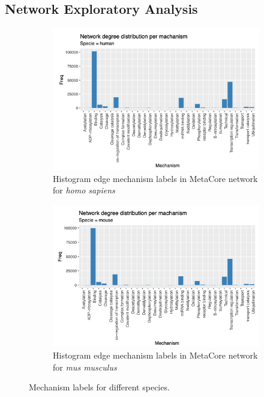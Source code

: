 \subsection{Network Exploratory Analysis}
\label{section:suppl:eda}

\begin{figure}[!htbp]
    \begin{subfigure}{0.5\linewidth}
        \includegraphics[width=\textwidth, height=\textheight, keepaspectratio]{Major Thesis/figures/eda/Degree_human.png}
            \caption{Histogram edge mechanism labels in MetaCore network for \textit{homo sapiens}}
    \end{subfigure}
    \hfill
    \begin{subfigure}{0.5\linewidth}
        \includegraphics[width=\textwidth, height=\textheight, keepaspectratio]{Major Thesis/figures/eda/Degree_mice.png}
            \caption{Histogram edge mechanism labels in MetaCore network for \textit{mus musculus}}
    \end{subfigure}
    \caption{Mechanism labels for different species.}
    \label{img:suppl:degrees}
\end{figure}


